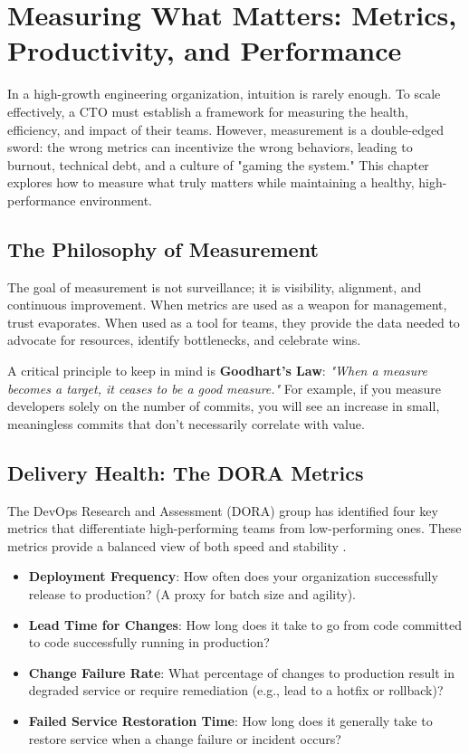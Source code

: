 \section{Measuring What Matters: Metrics, Productivity, and Performance}

In a high-growth engineering organization, intuition is rarely enough. To scale effectively, a CTO must establish a framework for measuring the health, efficiency, and impact of their teams. However, measurement is a double-edged sword: the wrong metrics can incentivize the wrong behaviors, leading to burnout, technical debt, and a culture of "gaming the system." This chapter explores how to measure what truly matters while maintaining a healthy, high-performance environment.

\subsection{The Philosophy of Measurement}
The goal of measurement is not surveillance; it is visibility, alignment, and continuous improvement. When metrics are used as a weapon for management, trust evaporates. When used as a tool for teams, they provide the data needed to advocate for resources, identify bottlenecks, and celebrate wins.

A critical principle to keep in mind is \textbf{Goodhart's Law}: \textit{"When a measure becomes a target, it ceases to be a good measure."} For example, if you measure developers solely on the number of commits, you will see an increase in small, meaningless commits that don't necessarily correlate with value.

\subsection{Delivery Health: The DORA Metrics}
The DevOps Research and Assessment (DORA) group has identified four key metrics that differentiate high-performing teams from low-performing ones. These metrics provide a balanced view of both speed and stability \cite{forsgren2018accelerate}.

\begin{itemize}
    \item \textbf{Deployment Frequency}: How often does your organization successfully release to production? (A proxy for batch size and agility).
    \item \textbf{Lead Time for Changes}: How long does it take to go from code committed to code successfully running in production?
    \item \textbf{Change Failure Rate}: What percentage of changes to production result in degraded service or require remediation (e.g., lead to a hotfix or rollback)?
    \item \textbf{Failed Service Restoration Time}: How long does it generally take to restore service when a change failure or incident occurs?
\end{itemize}

